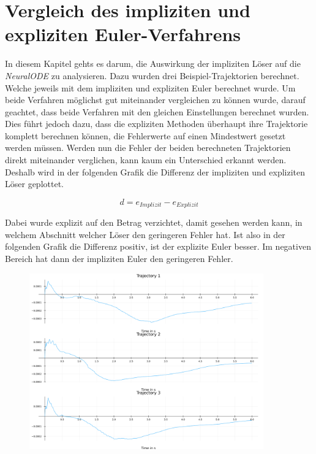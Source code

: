 
\section{Vergleich des impliziten und expliziten Euler-Verfahrens}

In diesem Kapitel gehts es darum, die Auswirkung der impliziten Löser auf die \textit{NeuralODE} zu analysieren.
Dazu wurden drei Beispiel-Trajektorien berechnet.
Welche jeweils mit dem impliziten und expliziten Euler berechnet wurde.
Um beide Verfahren möglichst gut miteinander vergleichen zu können wurde, darauf geachtet, dass beide Verfahren mit den gleichen Einstellungen berechnet wurden.
Dies führt jedoch dazu, dass die expliziten Methoden
überhaupt ihre Trajektorie komplett berechnen können, 
die Fehlerwerte auf einen Mindestwert gesetzt werden müssen.
Werden nun die Fehler der beiden berechneten Trajektorien
direkt miteinander verglichen, kann kaum ein Unterschied erkannt werden.
Deshalb wird in der folgenden Grafik
die Differenz der impliziten und expliziten Löser geplottet.

$$
d = e_{Implizit} - e_{Explizit}
$$

Dabei wurde explizit auf den Betrag verzichtet, damit gesehen werden kann, in welchem Abschnitt welcher Löser den geringeren Fehler hat.
Ist also in der folgenden Grafik die Differenz positiv, 
ist der explizite Euler besser.
Im negativen Bereich hat dann der impliziten Euler den geringeren Fehler.

\begin{figure}[H]
\includegraphics[width=0.9\textwidth]{Data/03_Ergebnisse/errors.png}
\label{fig:eulervergleich}
\end{figure}


